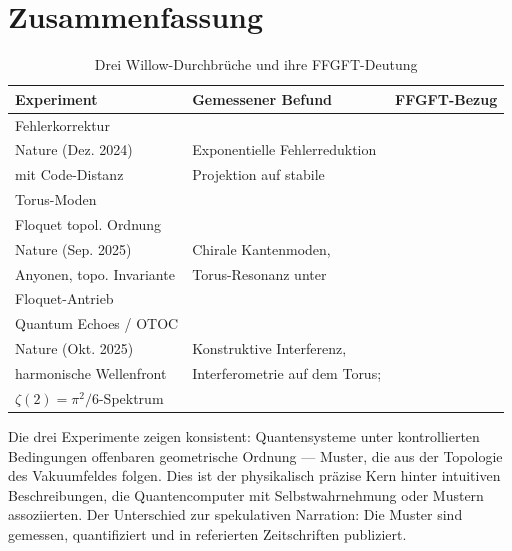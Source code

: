 \section{Zusammenfassung}

\begin{table}[ht]
\centering
\begin{tabular}{|p{3.2cm}|p{4.8cm}|p{4.2cm}|}
\hline
\textbf{Experiment} & \textbf{Gemessener Befund} & \textbf{FFGFT-Bezug} \\
\hline
Fehlerkorrektur\\Nature (Dez. 2024) &
Exponentielle Fehlerreduktion\\mit Code-Distanz &
Projektion auf stabile\\Torus-Moden \\
\hline
Floquet topol. Ordnung\\Nature (Sep. 2025) &
Chirale Kantenmoden,\\Anyonen, topo. Invariante &
Torus-Resonanz unter\\Floquet-Antrieb \\
\hline
Quantum Echoes / OTOC\\Nature (Okt. 2025) &
Konstruktive Interferenz,\\harmonische Wellenfront &
Interferometrie auf dem Torus;\\$\zeta(2) = \pi^2/6$-Spektrum \\
\hline
\end{tabular}
\caption{Drei Willow-Durchbrüche und ihre FFGFT-Deutung}
\end{table}

Die drei Experimente zeigen konsistent: Quantensysteme unter kontrollierten
Bedingungen offenbaren geometrische Ordnung — Muster, die aus der Topologie des
Vakuumfeldes folgen. Dies ist der physikalisch präzise Kern hinter intuitiven
Beschreibungen, die Quantencomputer mit Selbstwahrnehmung oder Mustern assoziierten.
Der Unterschied zur spekulativen Narration: Die Muster sind gemessen, quantifiziert
und in referierten Zeitschriften publiziert.

\vspace{0.8cm}

